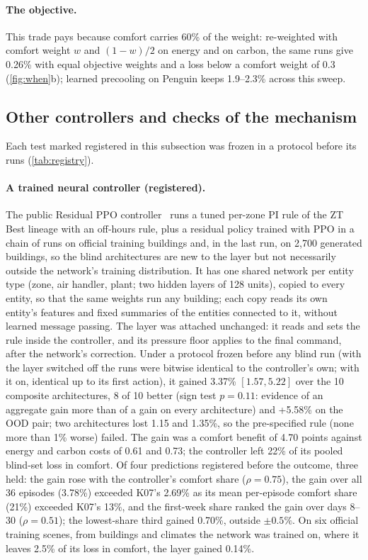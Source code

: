 \paragraph{The objective.}
This trade pays because comfort carries 60\% of the weight: re-weighted with comfort weight $w$ and $(1-w)/2$ on energy and on
carbon, the same runs give 0.26\% with equal objective weights
and a loss below a comfort weight of 0.3 (\cref{fig:when}b); learned precooling on Penguin keeps 1.9--2.3\% across this sweep.

\subsection{Other controllers and checks of the mechanism}\label{app:j-controllers}
Each test marked registered in this subsection was frozen in a protocol before its runs (\cref{tab:registry}).

\paragraph{A trained neural controller (registered).} The public Residual PPO controller~\cite{chilton2026resppo} runs a tuned per-zone PI
rule of the ZT Best lineage with an off-hours rule, plus a residual policy trained with PPO in a chain of runs on official training
buildings and, in the last run, on 2{,}700 generated buildings, so the blind architectures are new to the layer but not necessarily
outside the network's training distribution. It has one shared network per entity type (zone, air handler, plant;
two hidden layers of 128 units), copied to every entity, so that the same weights run any building; each copy reads its own entity's
features and fixed summaries of the entities connected to it, without learned message passing. The layer was
attached unchanged: it reads and sets the rule inside the controller, and its pressure floor applies to the final command, after the
network's correction. Under a protocol frozen before any blind run (with the layer switched off the runs were bitwise identical to the
controller's own; with it on, identical up to its first action), it gained 3.37\% $[1.57, 5.22]$ over the 10 composite
architectures, 8 of 10 better (sign test $p = 0.11$: evidence of an aggregate gain more than of a gain on every
architecture) and +5.58\% on the OOD pair; two architectures lost 1.15 and 1.35\%, so the
pre-specified rule (none more than 1\% worse) failed. The gain was a comfort benefit of 4.70 points against energy and
carbon costs of 0.61 and 0.73; the controller left 22\% of its pooled blind-set loss in comfort. Of four
predictions registered before the outcome, three held: the gain rose with the controller's comfort share ($\rho = 0.75$),
the gain over all 36 episodes (3.78\%) exceeded K07's 2.69\% as its mean per-episode comfort share (21\%) exceeded
K07's 13\%, and the first-week share ranked the gain over days 8--30 ($\rho = 0.51$); the
lowest-share third gained 0.70\%, outside $\pm 0.5\%$. On six official training scenes, from buildings and
climates the network was trained on, where it leaves 2.5\% of its loss in comfort, the layer gained 0.14\%.


